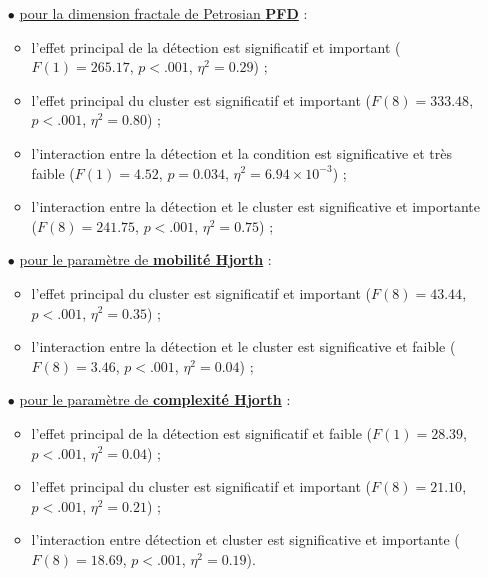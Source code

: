 \begin{itemize}
\begin{itemize}
\end{itemize}
\item[$\bullet$] \underline{pour la dimension fractale de Petrosian \textbf{PFD}} : 
\begin{itemize} 
\item l'effet principal de la détection est significatif et important ($F(1)=265.17$, $p<.001$, $\eta^2=0.29$) ; 
\item l'effet principal du cluster est significatif et important ($F(8)=333.48$, $p<.001$, $\eta^2=0.80$) ; 
\item l'interaction entre la détection et la condition est significative et très faible ($F(1)=4.52$, $p=0.034$, $\eta^2=6.94\times10^{-3}$) ; 
\item l'interaction entre la détection et le cluster est significative et importante ($F(8)=241.75$, $p<.001$, $\eta^2=0.75$) ;
\end{itemize}
\item[$\bullet$] \underline{pour le paramètre de \textbf{mobilité Hjorth}} : 
\begin{itemize} 
\item l'effet principal du cluster est significatif et important ($F(8)=43.44$, $p<.001$, $\eta^2=0.35$) ; 
\item l'interaction entre la détection et le cluster est significative et faible ($F(8)=3.46$, $p<.001$, $\eta^2=0.04$) ; 
\end{itemize}
\item[$\bullet$] \underline{pour le paramètre de \textbf{complexité Hjorth}} : 
\begin{itemize} 
\item l'effet principal de la détection est significatif et faible ($F(1)=28.39$, $p<.001$, $\eta^2=0.04$) ; 
\item l'effet principal du cluster est significatif et important ($F(8)=21.10$, $p<.001$, $\eta^2=0.21$) ; 
\item l'interaction entre détection et cluster est significative et importante ($F(8)=18.69$, $p<.001$, $\eta^2=0.19$). \\
\end{itemize}
\end{itemize}

